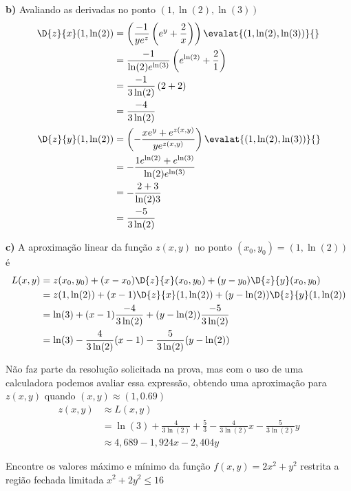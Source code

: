 \documentclass[a4paper,12pt,fleqn]{article}
\begin{document}
\begin{answer}
  \vspace{\baselineskip}
  \textbf{b)\;}
  Avaliando as derivadas no ponto \((1, \ln(2), \ln(3))\)
  \begin{align*}
    \D{z}{x}(1, \ln(2))
    & = \left(\frac{-1}{ye^z}\left(e^y + \frac{2}{x}\right)\right)\evalat{(1, \ln(2), \ln(3))}{} \\
    & = \frac{-1}{\ln(2)e^{\ln(3)}}\left(e^{\ln(2)} + \frac{2}{1}\right) \\
    & = \frac{-1}{3\ln(2)}\left(2 + 2\right) \\
    & = \frac{-4}{3\ln(2)} \\
    \D{z}{y}(1, \ln(2))
    & = \left(- \frac{xe^y + e^{z(x, y)}}{ye^{z(x, y)}}\right)\evalat{(1, \ln(2), \ln(3))}{} \\
    & = - \frac{1e^{\ln(2)} + e^{\ln(3)}}{{\ln(2)}e^{\ln(3)}} \\
    & = - \frac{2 + 3}{{\ln(2)}3} \\
    & = \frac{-5}{3\ln(2)}
  \end{align*}

  \vspace{\baselineskip}
  \textbf{c)\;}
  A aproximação linear da função $z(x, y)$ no ponto \((x_0, y_0) = (1, \ln(2))\) é
  \begin{align*}
    L(x, y)
    & = z(x_0, y_0) + (x-x_0)\D{z}{x}(x_0, y_0) + (y-y_0)\D{z}{y}(x_0, y_0) \\
    & = z(1, \ln(2)) + (x-1)\D{z}{x}(1, \ln(2)) + (y-\ln(2))\D{z}{y}(1, \ln(2)) \\
    & = \ln(3) + (x-1)\frac{-4}{3\ln(2)} + (y-\ln(2))\frac{-5}{3\ln(2)} \\
    & = \ln(3) - \frac{4}{3\ln(2)}(x-1) - \frac{5}{3\ln(2)}(y-\ln(2))
  \end{align*}

  Não faz parte da resolução solicitada na prova, mas com o uso de uma calculadora
  podemos avaliar essa expressão, obtendo uma aproximação para $z(x, y)$
  quando $(x, y)\approx (1, 0.69)$
  \begin{align*}
    z(x, y) & \approx L(x, y) \\
    & = \ln(3)
    + \frac{4}{3\ln(2)}
    + \frac{5}{3}
    - \frac{4}{3\ln(2)} x
    - \frac{5}{3\ln(2)} y \\
    & \approx 4,689 -1,924 x - 2,404 y
  \end{align*}
\end{answer}

Encontre os valores máximo e mínimo da função
\(
  f(x, y) = 2x^2 + y^2
\)
restrita a região fechada limitada
\(
  x^2 + 2y^2 \leq 16
\)
\clearpagequestiononly
\end{document}
